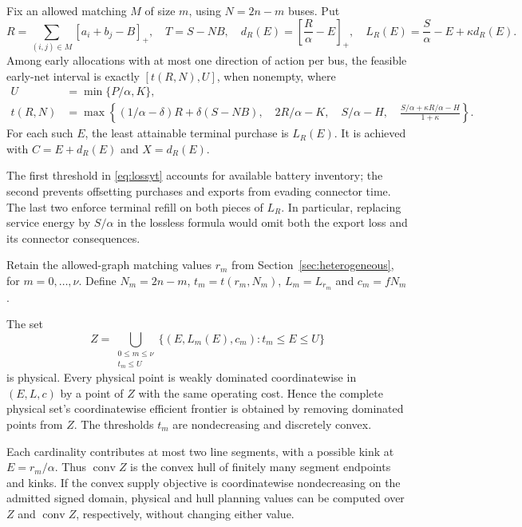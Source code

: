 \begin{lemma}
\label{lem:lossyfixed}
Fix an allowed matching $M$ of size $m$, using $N=2n-m$ buses. Put
\[
 R=\sum_{(i,j)\in M}[a_i+b_j-B]_+,\quad T=S-NB,\quad
 d_R(E)=\left[\frac R\alpha-E\right]_+,\quad
 L_R(E)=\frac S\alpha-E+\kappa d_R(E).
\]
Among early allocations with at most one direction of action per bus,
the feasible early-net interval is exactly $[t(R,N),U]$, when nonempty,
where
\begin{align}
 U&=\min\{P/\alpha,K\},\label{eq:lossyU}\\
 t(R,N)&=\max\left\{
 (1/\alpha-\delta)R+\delta(S-NB),\quad
 2R/\alpha-K,\quad S/\alpha-H,\quad
 \frac{S/\alpha+\kappa R/\alpha-H}{1+\kappa}
 \right\}.\label{eq:lossyt}
\end{align}
For each such $E$, the least attainable terminal purchase is $L_R(E)$.
It is achieved with $C=E+d_R(E)$ and $X=d_R(E)$.
\end{lemma}

The first threshold in \eqref{eq:lossyt} accounts for available battery
inventory; the second prevents offsetting purchases and exports from
evading connector time. The last two enforce terminal refill on both
pieces of $L_R$. In particular, replacing service energy by $S/\alpha$
in the lossless formula would omit both the export loss and its connector
consequences.

Retain the allowed-graph matching values $r_m$ from
Section~\ref{sec:heterogeneous}, for $m=0,\ldots,\nu$. Define
$N_m=2n-m$, $t_m=t(r_m,N_m)$, $L_m=L_{r_m}$ and $c_m=fN_m$.
\begin{theorem}
\label{thm:lossyfrontier}
The set
\begin{equation}\label{eq:lossyZ}
 Z=\bigcup_{\substack{0\le m\le\nu\\t_m\le U}}
 \{(E,L_m(E),c_m):t_m\le E\le U\}
\end{equation}
is physical. Every physical point is weakly dominated coordinatewise
in $(E,L,c)$ by a point of $Z$ with the same operating cost. Hence the
complete physical set's coordinatewise efficient frontier is obtained
by removing dominated points from $Z$. The thresholds $t_m$ are
nondecreasing and discretely convex.

Each cardinality contributes at most two line segments, with a possible
kink at $E=r_m/\alpha$. Thus $\operatorname{conv}Z$ is the convex hull
of finitely many segment endpoints and kinks. If the convex supply
objective is coordinatewise nondecreasing on the admitted signed domain,
physical and hull planning values can be computed over $Z$ and
$\operatorname{conv}Z$, respectively, without changing either value.
\end{theorem}

